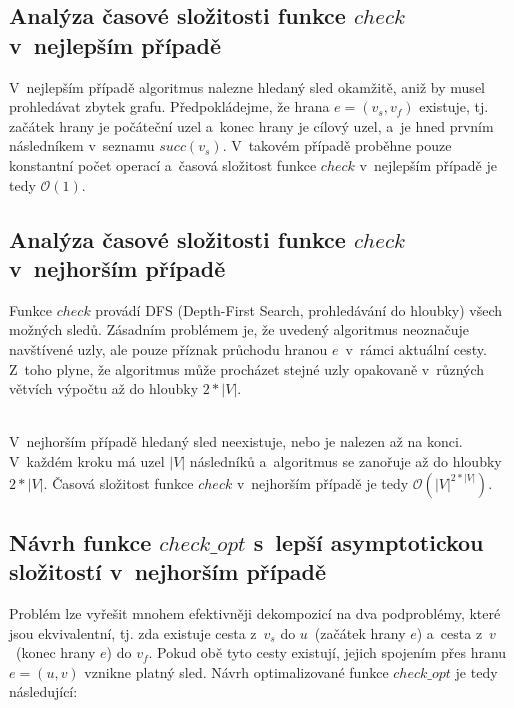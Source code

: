 \documentclass[a4paper, 11pt]{article}
\begin{document}
\subsection*{Analýza časové složitosti funkce $check$ v~nejlepším případě}

V~nejlepším případě algoritmus nalezne hledaný sled okamžitě, aniž by musel prohledávat zbytek grafu.
Předpokládejme, že hrana $e = (v_s, v_f)$ existuje, tj. začátek hrany je počáteční uzel a~konec hrany je cílový uzel, a~je hned prvním následníkem v~seznamu $succ (v_s)$.
V~takovém případě proběhne pouze konstantní počet operací a~časová složitost funkce $check$ v~nejlepším případě je tedy $\mathcal{O} (1)$.

\subsection*{Analýza časové složitosti funkce $check$ v~nejhorším případě}

Funkce $check$ provádí DFS (Depth-First Search, prohledávání do hloubky) všech možných sledů.
Zásadním problémem je, že uvedený algoritmus neoznačuje navštívené uzly, ale pouze příznak průchodu hranou $e$~v~rámci aktuální cesty.
Z~toho plyne, že algoritmus může procházet stejné uzly opakovaně v~různých větvích výpočtu až do hloubky $2 \ast |V|$.

\noindent \\ V~nejhorším případě hledaný sled neexistuje, nebo je nalezen až na konci.
V~každém kroku má uzel $|V|$ následníků a~algoritmus se zanořuje až do hloubky $2 \ast |V|$.
Časová složitost funkce $check$ v~nejhorším případě je tedy $\mathcal{O} (|V|^{2 \ast |V|})$.

\newpage

\subsection*{Návrh funkce $check\_opt$ s~lepší asymptotickou složitostí v~nejhorším případě}

Problém lze vyřešit mnohem efektivněji dekompozicí na dva podproblémy, které jsou ekvivalentní, tj. zda existuje cesta z~$v_s$ do $u$~(začátek hrany $e$) a~cesta z~$v$~(konec hrany $e$) do $v_f$.
Pokud obě tyto cesty existují, jejich spojením přes hranu $e = (u, v)$ vznikne platný sled.
Návrh optimalizované funkce $check\_opt$ je tedy následující:
\end{document}
